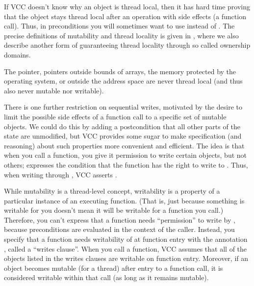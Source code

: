 \begin{note}
If VCC doesn't know why an object is thread local, then it has
hard time proving that the object stays thread local after an operation
with side effects (\eg a function call).
Thus, in preconditions you will sometimes want to use
 instead of .
The precise definitions of mutability and thread locality
is given in ,
where we also describe another form of guaranteeing thread locality
through so called ownership domains.
\end{note}

The  pointer, pointers outside bounds of arrays,
the memory protected by the operating system, or outside
the address space are never thread local (and thus also never mutable
nor writable).

There is one further restriction on sequential writes, motivated by
the desire to limit the possible side effects of a function call to a
specific set of mutable objects. We could do this by adding a
postcondition that all other parts of the state are unmodified, but
VCC provides some sugar to make specification (and reasoning) about
such properties more convenient and efficient. The idea is that when
you call a function, you give it permission to write certain objects,
but not others;  expresses the condition that
the function has the right to write to
. Thus, when writing through , VCC asserts
.

While mutability is a thread-level concept, writability is a property
of a particular instance of an executing function. (That is, just
because something is writable for you doesn't mean it will be writable
for a function you call.) Therefore, you can't express that a function
needs ``permission'' to write  by , because preconditions are evaluated in the context
of the caller. Instead, you specify that a function needs writability
of  at function entry with the annotation ,
called a ``writes clause''. When you call a function, VCC assumes that
all of the objects listed in the writes clauses are writable on
function entry.  Moreover, if an object becomes mutable (for a thread)
after entry to a function call, it is considered writable within that
call (as long as it remains mutable).



